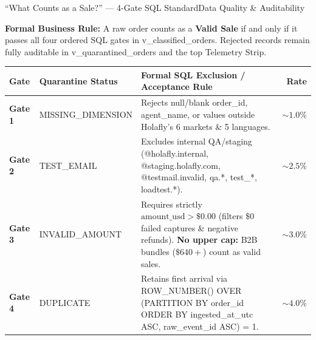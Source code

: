 \documentclass[aspectratio=169,8pt]{beamer}
\newcommand{\code}[1]{{\fontfamily{pcr}\selectfont\fontsize{6.5}{8.0}\selectfont\color{ink}#1}}
\begin{document}
\begin{frame}[t]{``What Counts as a Sale?'' --- 4-Gate SQL Standard}{Data Quality \& Auditability}
\vspace{1pt}
\begin{calloutbar}
  {\fontsize{6.5}{8.0}\selectfont \textbf{Formal Business Rule:} A raw order counts as a \textbf{Valid Sale} if and only if it passes all four ordered SQL gates in \code{v\_classified\_orders}. Rejected records remain fully auditable in \code{v\_quarantined\_orders} and the top Telemetry Strip.}
\end{calloutbar}

\vspace{2.5pt}
\renewcommand{\arraystretch}{1.05}
{\fontsize{6.3}{7.6}\selectfont
\begin{tabularx}{\textwidth}{@{}l l >{\raggedright\arraybackslash}X r@{}}
\toprule
\rowcolor{linen}
\textbf{\color{ink}Gate} & \textbf{\color{ink}Quarantine Status} & \textbf{\color{ink}Formal SQL Exclusion / Acceptance Rule} & \textbf{\color{ink}Rate} \\
\midrule
\textbf{Gate 1} & \code{MISSING\_DIMENSION} & Rejects null/blank \code{order\_id}, \code{agent\_name}, or values outside Holafly's 6 markets \& 5 languages. & $\sim 1.0\%$ \\
\rowcolor{purewhite}
\textbf{Gate 2} & \code{TEST\_EMAIL} & Excludes internal QA/staging (\code{@holafly.internal}, \code{@staging.holafly.com}, \code{@testmail.invalid}, \code{qa.*}, \code{test\_*}, \code{loadtest.*}). & $\sim 2.5\%$ \\
\textbf{Gate 3} & \code{INVALID\_AMOUNT} & Requires strictly \textbf{$\text{amount\_usd} > \$0.00$} (filters $\$0$ failed captures \& negative refunds). \textbf{No upper cap:} B2B bundles ($\$640+$) count as valid sales. & $\sim 3.0\%$ \\
\rowcolor{purewhite}
\textbf{Gate 4} & \code{DUPLICATE} & Retains first arrival via \code{ROW\_NUMBER() OVER (PARTITION BY order\_id ORDER BY ingested\_at\_utc ASC, raw\_event\_id ASC) = 1}. & $\sim 4.0\%$ \\
\bottomrule
\end{tabularx}
}


\end{frame}
\end{document}
